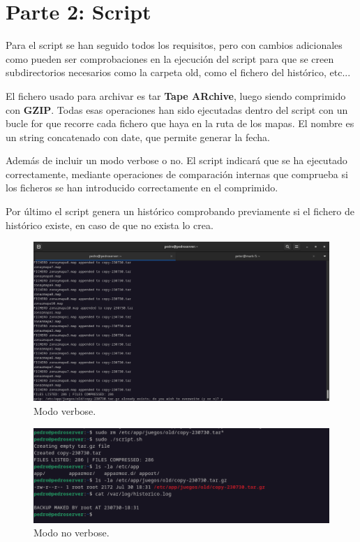 \section{Parte 2: Script}

Para el script se han seguido todos los requisitos, pero con cambios adicionales como pueden ser comprobaciones en la ejecución del script para que se creen subdirectorios necesarios como la carpeta old, como el fichero del histórico, etc...
\vspace{5mm}

El fichero usado para archivar es tar \textbf{Tape ARchive}, luego siendo comprimido con \textbf{GZIP}. Todas esas operaciones han sido ejecutadas dentro del script con un bucle for que recorre cada fichero que haya en la ruta de los mapas. El nombre es un string concatenado con date, que permite generar la fecha.
\vspace{5mm}

Además de incluir un modo verbose o no. El script indicará que se ha ejecutado correctamente, mediante operaciones de comparación internas que comprueba si los ficheros se han introducido correctamente en el comprimido.
\vspace{5mm}

Por último el script genera un histórico comprobando previamente si el fichero de histórico existe, en caso de que no exista lo crea.

\begin{figure}[H]
	\centering
	\includegraphics[scale=0.30]{01}
	\caption{Modo verbose.}
\end{figure}

\begin{figure}[H]
	\centering
	\includegraphics[scale=0.40]{02}
	\caption{Modo no verbose.}
\end{figure}

